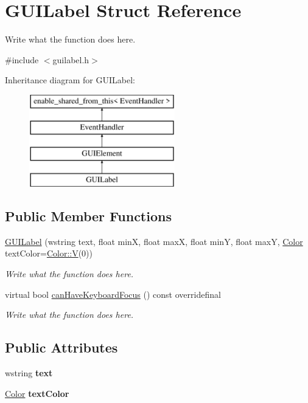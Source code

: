 \hypertarget{structGUILabel}{\section{G\+U\+I\+Label Struct Reference}
\label{structGUILabel}
}


Write what the function does here.  




{\ttfamily \#include $<$guilabel.\+h$>$}

Inheritance diagram for G\+U\+I\+Label\+:\begin{figure}[H]
\begin{center}
\leavevmode
\includegraphics[height=4.000000cm]{structGUILabel}
\end{center}
\end{figure}
\subsection*{Public Member Functions}
\begin{DoxyCompactItemize}
\item 
\hyperlink{structGUILabel_ac4d7442b38260774b14536b343f4ff51}{G\+U\+I\+Label} (wstring text, float min\+X, float max\+X, float min\+Y, float max\+Y, \hyperlink{structColor}{Color} text\+Color=\hyperlink{structColor_a723061c1cca0072a8ecb591c4c3b4479}{Color\+::\+V}(0))
\begin{DoxyCompactList}\small\item\em Write what the function does here. \end{DoxyCompactList}\item 
virtual bool \hyperlink{structGUILabel_aa0127a15c722bc35de3441e8d2952a28}{can\+Have\+Keyboard\+Focus} () const overridefinal
\begin{DoxyCompactList}\small\item\em Write what the function does here. \end{DoxyCompactList}\end{DoxyCompactItemize}
\subsection*{Public Attributes}
\begin{DoxyCompactItemize}
\item 
\hypertarget{structGUILabel_a455ecc85732712f002fce8dcb4f8b0db}{wstring {\bfseries text}}\label{structGUILabel_a455ecc85732712f002fce8dcb4f8b0db}

\item 
\hypertarget{structGUILabel_a6ecebb11c95e284a76e706d774966067}{\hyperlink{structColor}{Color} {\bfseries text\+Color}}\label{structGUILabel_a6ecebb11c95e284a76e706d774966067}

\end{DoxyCompactItemize}
